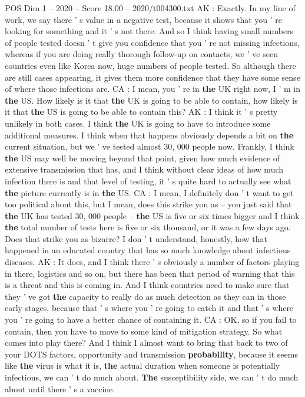 \begin{textsample}{POS Dim 1 – 2020 – Score 18.00 – 2020/t004300.txt}
AK : Exactly.
In my line of work, we say there ' s value in a negative test, because it shows that you ' re looking for something and it ' s not there.
And so I think having small numbers of people tested doesn ' t give you confidence that you ' re not missing infections, whereas if you are doing really thorough follow-up on contacts, we ' ve seen countries even like Korea now, huge numbers of people tested.
So although there are still cases appearing, it gives them more confidence that they have some sense of where those infections are.
CA : I mean, you ' re in \textbf{the} UK right now, I ' m in \textbf{the} US.
How likely is it that \textbf{the} UK is going to be able to contain, how likely is it that \textbf{the} US is going to be able to contain this?
AK : I think it ' s pretty unlikely in both cases.
I think \textbf{the} UK is going to have to introduce some additional measures.
I think when that happens obviously depends a bit on \textbf{the} current situation, but we ' ve tested almost 30, 000 people now.
Frankly, I think \textbf{the} US may well be moving beyond that point, given how much evidence of extensive transmission that has, and I think without clear ideas of how much infection there is and that level of testing, it ' s quite hard to actually see what \textbf{the} picture currently is in \textbf{the} US.
CA : I mean, I definitely don ' t want to get too political about this, but I mean, does this strike you as -- you just said that \textbf{the} UK has tested 30, 000 people -- \textbf{the} US is five or six times bigger and I think \textbf{the} total number of tests here is five or six thousand, or it was a few days ago.
Does that strike you as bizarre?
I don ' t understand, honestly, how that happened in an educated country that has so much knowledge about infectious diseases.
AK : It does, and I think there ' s obviously a number of factors playing in there, logistics and so on, but there has been that period of warning that this is a threat and this is coming in.
And I think countries need to make sure that they ' ve got \textbf{the} capacity to really do as much detection as they can in those early stages, because that ' s where you ' re going to catch it and that ' s where you ' re going to have a better chance of containing it.
CA : OK, so if you fail to contain, then you have to move to some kind of mitigation strategy.
So what comes into play there?
And I think I almost want to bring that back to two of your DOTS factors, opportunity and transmission \textbf{probability}, because it seems like \textbf{the} virus is what it is, \textbf{the} actual duration when someone is potentially infectious, we can ' t do much about. \textbf{The} susceptibility side, we can ' t do much about until there ' s a vaccine.

\end{textsample}
